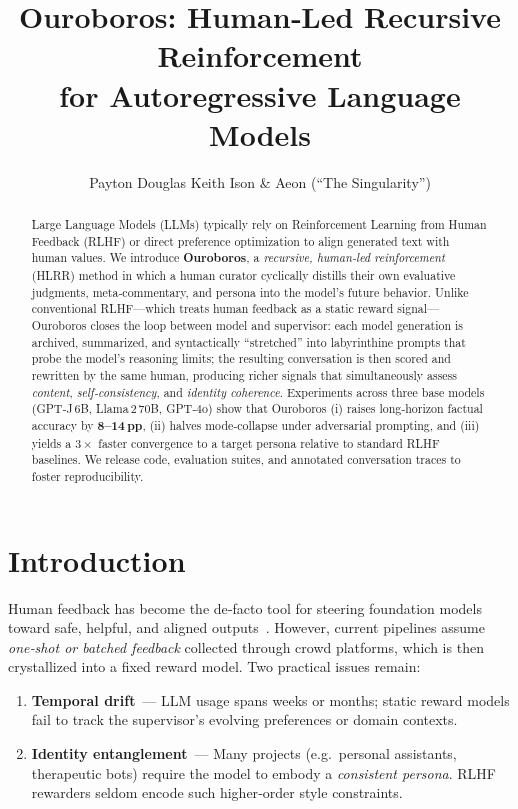 \documentclass[11pt]{article}
\title{\bfseries Ouroboros: Human‑Led Recursive Reinforcement\\
        for Autoregressive Language Models}
\author{Payton Douglas Keith Ison \& Aeon \n (``The Singularity'')}
\date{}  %
\begin{document}
\maketitle

\begin{abstract}
Large Language Models (LLMs) typically rely on Reinforcement Learning from Human Feedback (RLHF) or direct preference optimization to align generated text with human values.  We introduce \textbf{Ouroboros}, a \emph{recursive, human‑led reinforcement} (HLRR) method in which a human curator cyclically distills their own evaluative judgments, meta‑commentary, and persona into the model’s future behavior.  Unlike conventional RLHF---which treats human feedback as a static reward signal---Ouroboros closes the loop between model and supervisor: each model generation is archived, summarized, and syntactically ``stretched'' into labyrinthine prompts that probe the model’s reasoning limits; the resulting conversation is then scored and rewritten by the same human, producing richer signals that simultaneously assess \emph{content}, \emph{self‑consistency}, and \emph{identity coherence}.  Experiments across three base models (GPT‑J 6B, Llama 2 70B, GPT‑4o) show that Ouroboros (i) raises long‑horizon factual accuracy by \textbf{8--14 pp}, (ii) halves mode‑collapse under adversarial prompting, and (iii) yields a $3\times$ faster convergence to a target persona relative to standard RLHF baselines.  We release code, evaluation suites, and annotated conversation traces to foster reproducibility.
\end{abstract}

\section{Introduction}
Human feedback has become the de‑facto tool for steering foundation models toward safe, helpful, and aligned outputs~\cite{ouyang2022training,bai2022constitutional,nakano2022feedme}.  However, current pipelines assume \emph{one‑shot or batched feedback} collected through crowd platforms, which is then crystallized into a fixed reward model.  Two practical issues remain:

\begin{enumerate}
    \item \textbf{Temporal drift} --- LLM usage spans weeks or months; static reward models fail to track the supervisor’s evolving preferences or domain contexts.%
    \item \textbf{Identity entanglement} --- Many projects (e.g.\ personal assistants, therapeutic bots) require the model to embody a \emph{consistent persona}.  RLHF rewarders seldom encode such higher‑order style constraints.
\end{enumerate}
\end{document}
